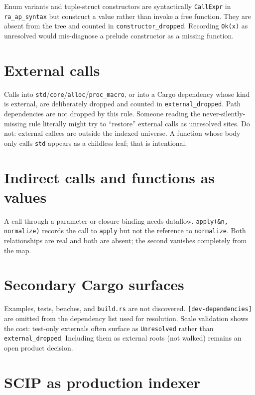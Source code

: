 \documentclass[11pt,a4paper,oneside]{report}
\begin{document}
Enum variants and tuple-struct constructors are syntactically
\texttt{CallExpr} in \texttt{ra\_ap\_syntax} but construct a value rather than
invoke a free function. They are absent from the tree and counted in
\texttt{constructor\_dropped}. Recording \texttt{Ok(x)} as unresolved would
mis-diagnose a prelude constructor as a missing function.

\section{External calls}

Calls into \texttt{std}/\texttt{core}/\texttt{alloc}/\texttt{proc\_macro}, or
into a Cargo dependency whose kind is external, are deliberately dropped and
counted in \texttt{external\_dropped}. Path dependencies are not dropped by
this rule. Someone reading the never-silently-missing rule literally might
try to ``restore'' external calls as unresolved sites. Do not: external
callees are outside the indexed universe. A function whose body only calls
\texttt{std} appears as a childless leaf; that is intentional.

\section{Indirect calls and functions as values}

A call through a parameter or closure binding needs dataflow.
\texttt{apply(\&n, normalize)} records the call to \texttt{apply} but not the
reference to \texttt{normalize}. Both relationships are real and both are
absent; the second vanishes completely from the map.

\section{Secondary Cargo surfaces}

Examples, tests, benches, and \texttt{build.rs} are not discovered.
\texttt{[dev-dependencies]} are omitted from the dependency list used for
resolution. Scale validation shows the cost: test-only externals often surface
as \texttt{Unresolved} rather than \texttt{external\_dropped}. Including them
as external roots (not walked) remains an open product decision.

\section{SCIP as production indexer}
\end{document}
